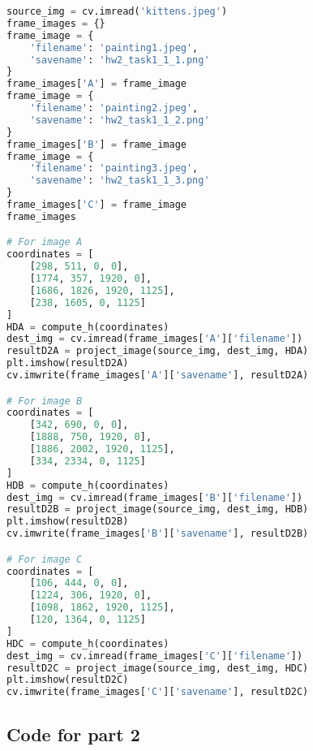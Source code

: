 \documentclass[11pt]{article}
\begin{document}
\begin{lstlisting}[language=Python, showstringspaces=false]
source_img = cv.imread('kittens.jpeg')
frame_images = {}
frame_image = {
    'filename': 'painting1.jpeg',
    'savename': 'hw2_task1_1_1.png'
}
frame_images['A'] = frame_image
frame_image = {
    'filename': 'painting2.jpeg',
    'savename': 'hw2_task1_1_2.png'
}
frame_images['B'] = frame_image
frame_image = {
    'filename': 'painting3.jpeg',
    'savename': 'hw2_task1_1_3.png'
}
frame_images['C'] = frame_image
frame_images

# For image A
coordinates = [
    [298, 511, 0, 0],
    [1774, 357, 1920, 0],
    [1686, 1826, 1920, 1125],
    [238, 1605, 0, 1125]
]
HDA = compute_h(coordinates)
dest_img = cv.imread(frame_images['A']['filename'])
resultD2A = project_image(source_img, dest_img, HDA)
plt.imshow(resultD2A)
cv.imwrite(frame_images['A']['savename'], resultD2A)

# For image B
coordinates = [
    [342, 690, 0, 0],
    [1888, 750, 1920, 0],
    [1886, 2002, 1920, 1125],
    [334, 2334, 0, 1125]
]
HDB = compute_h(coordinates)
dest_img = cv.imread(frame_images['B']['filename'])
resultD2B = project_image(source_img, dest_img, HDB)
plt.imshow(resultD2B)
cv.imwrite(frame_images['B']['savename'], resultD2B)

# For image C
coordinates = [
    [106, 444, 0, 0],
    [1224, 306, 1920, 0],
    [1098, 1862, 1920, 1125],
    [120, 1364, 0, 1125]
]
HDC = compute_h(coordinates)
dest_img = cv.imread(frame_images['C']['filename'])
resultD2C = project_image(source_img, dest_img, HDC)
plt.imshow(resultD2C)
cv.imwrite(frame_images['C']['savename'], resultD2C)

\end{lstlisting}


\subsection*{Code for part 2}
\end{document}
